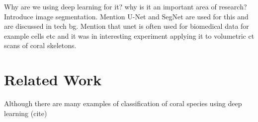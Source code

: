 Why are we using deep learning for it? why is it an important area of research?
Introduce image segmentation. Mention U-Net and SegNet are used for this and are discussed in tech bg. Mention that unet is often used for biomedical data for example cells etc and it was in interesting experiment applying it to volumetric ct scans of coral skeletons.

\section{Related Work}

Although there are many examples of classification of coral species using deep learning (cite)



 



